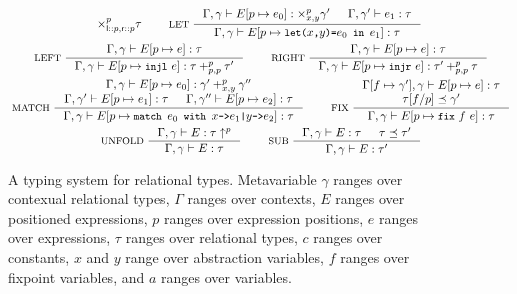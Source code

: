 \begin{figure}
\begin{gather*}
{      \times_{\leftchild \cons p, \rightchild \cons p}^p \tau } \qquad
    \inference[ LET ]{
      \Gamma, \gamma \judges \upd{ E }{p}{ e_0 } : \times_{x, y}^p \gamma' &
      \Gamma, \gamma' \judges e_1 : \tau }{
      \Gamma, \gamma \judges \upd{E}{p}{ \letexp{x}{y}{e_0}{e_1} } : %
      \tau } \\
    \inference[ LEFT ]{
      \Gamma, \gamma \judges \upd{E}{p}{ e } : \tau }{
      \Gamma, \gamma \judges \upd{E}{p}{ \injl\ e} : %
      \tau +_{p, p}^p \tau' } \qquad
    \inference[ RIGHT ]{
      \Gamma, \gamma \judges \upd{E}{p}{ e } : \tau }{
      \Gamma, \gamma \judges \upd{E}{p}{ \injr\ e} : %
      \tau' +_{p, p}^p \tau } \\
    \inference[ MATCH ]{
      \Gamma, \gamma \judges \upd{E}{p}{e_0} : %
      \gamma' +_{x, y}^p \gamma'' \\
      \Gamma, \gamma' \judges \upd{E}{p}{e_1} : \tau &
      \Gamma, \gamma'' \judges \upd{E}{p}{e_2} : \tau }{
      \Gamma, \gamma \judges %
      \upd{E}{p}{ \matchexp{e_0}{ x }{e_1}{ y }{e_2} } : \tau } \qquad
    \inference[ FIX ]{
      \upd{ \Gamma }{ f }{ \gamma' }, \gamma \judges %
      \upd{ E }{ p }{ e } : \tau \\
      \replace{ \tau }{ p }{ f } \subtype \gamma' }{ %
      \Gamma, \gamma \judges \upd{ E }{ p }{ \fix{f}{e} }: \tau } \\
    \inference[ UNFOLD ]{
      \Gamma, \gamma \judges E : \unfold{\tau}{p} }{ 
      \Gamma, \gamma \judges E : \tau } \qquad
    \inference[ SUB ]{
      \Gamma, \gamma \judges E : \tau &
      \tau \subtype \tau' }{ %
      \Gamma, \gamma \judges E : \tau' }
  \end{gather*}
  \caption{A typing system for relational types.
    Metavariable %
    $\gamma$ ranges over contexual relational types, %
    $\Gamma$ ranges over contexts, %
    $E$ ranges over positioned expressions, %
    $p$ ranges over expression positions, %
    $e$ ranges over expressions, %
    $\tau$ ranges over relational types, %
    $c$ ranges over constants, %
    $x$ and $y$ range over abstraction variables, %
    $f$ ranges over fixpoint variables, and %
    $a$ ranges over variables. }
  \label{fig:reltypes-rules}
\end{figure}

